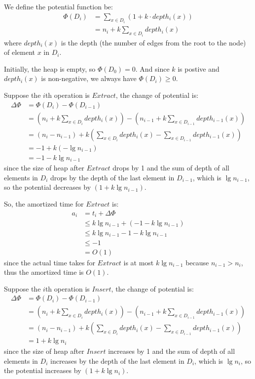 \documentclass[11pt]{article}
\begin{document}
\begin{enumerate}
  We define the potential function be:
  \begin{align}
    \Phi(D_i) &= \sum_{x \in D_i} (1 + k \cdot depth_i(x))\\
    &= n_i + k\sum_{x \in D_i} depth_i(x)
  \end{align}
  where $depth_i(x)$ is the depth (the number of edges from the root
  to the node) of element $x$ in $D_i$.

  Initially, the heap is empty, so $\Phi(D_0) = 0$. And since $k$ is
  postive and $depth_i(x)$ is non-negative, we always have $\Phi(D_i)
  \geq 0$. 

  Suppose the $i$th operation is $Extract$, the change of potential is:
  \begin{align}
    \Delta\Phi &= \Phi(D_i) - \Phi(D_{i-1})\\
    &= (n_i + k\sum_{x \in D_i} depth_i(x)) - (n_{i-1} + k\sum_{x \in
      D_{i-1}} depth_{i-1}(x)) \\
    &= (n_i - n_{i-1}) + k(\sum_{x \in D_i}depth_i(x) - \sum_{x \in
      D_{i-1}}depth_{i-1}(x))\\
    &= -1 + k(-\lg n_{i-1})\\
    &= -1 - k\lg n_{i-1}
  \end{align}
  since the size of heap after $Extract$ drops by 1 and the sum of
  depth of all elements in $D_i$ drops by the depth of the last
  element in $D_{i-1}$, which is $\lg n_{i-1}$, so the potential
  decreases by $(1 + k\lg n_{i-1})$. 
  
  So, the amortized time for $Extract$ is:
  \begin{align}
    a_i &= t_i + \Delta\Phi\\
    &\leq k\lg n_{i-1} + (-1 - k\lg n_{i-1})\\
    &\leq k\lg n_{i-1} -1 - k\lg n_{i-1}\\
    &\leq -1\\
    &= O(1)
  \end{align}
  since the actual time takes for $Extract$ is at most $k\lg n_{i-1}$
  because $n_{i-1} > n_i$, thus the amortized time is $O(1)$.

  Suppose the $i$th operation is $Insert$, the change of potential is:
  \begin{align}
    \Delta\Phi &= \Phi(D_i) - \Phi(D_{i-1})\\
    &= (n_i + k\sum_{x \in D_i} depth_i(x)) - (n_{i-1} + k\sum_{x \in
      D_{i-1}} depth_{i-1}(x)) \\
    &= (n_i - n_{i-1}) + k(\sum_{x \in D_i}depth_i(x) - \sum_{x \in
      D_{i-1}}depth_{i-1}(x))\\
    &= 1 + k\lg n_i
  \end{align}
  since the size of heap after $Insert$ increases by 1 and the sum of
  depth of all elements in $D_i$ increases by the depth of the last
  element in $D_i$, which is $\lg n_i$, so the potential
  increases by $(1 + k\lg n_i)$.
  

\end{enumerate}
\end{document}
